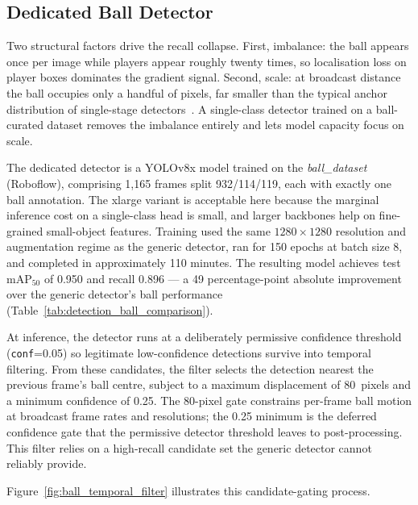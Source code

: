 \subsection{Dedicated Ball Detector}
\label{subsec:methodology_ball_detector}

Two structural factors drive the recall collapse. First, imbalance: the ball
appears once per image while players appear roughly twenty times, so
localisation loss on player boxes dominates the gradient signal. Second,
scale: at broadcast distance the ball occupies only a handful of pixels, far
smaller than the typical anchor distribution of single-stage
detectors~\cite{Redmon2016, redmon2018yolov3}. A single-class detector
trained on a ball-curated dataset removes the imbalance entirely and lets
model capacity focus on scale.

The dedicated detector is a YOLOv8x model trained on the
\textit{ball\_dataset} (Roboflow), comprising 1{,}165 frames split 932/114/119,
each with exactly one ball annotation. The xlarge variant is acceptable
here because the marginal inference cost on a single-class head is small, and larger
backbones help on fine-grained small-object features. Training used the same
$1280 \times 1280$ resolution and augmentation regime as the generic
detector, ran for 150 epochs at batch size 8, and completed in approximately
110 minutes. The resulting model achieves test $\mathrm{mAP}_{50}$ of 0.950 and recall
0.896 --- a 49 percentage-point absolute improvement over the generic
detector's ball performance (Table~\ref{tab:detection_ball_comparison}).

At inference, the detector runs at a deliberately permissive confidence
threshold (\texttt{conf}=0.05) so legitimate low-confidence detections
survive into temporal filtering. From these candidates, the filter selects
the detection nearest the previous frame's ball centre, subject to a maximum
displacement of 80~pixels and a minimum confidence of 0.25. The 80-pixel
gate constrains per-frame ball motion at broadcast frame rates and
resolutions; the 0.25 minimum is the deferred confidence gate that the
permissive detector threshold leaves to post-processing. This filter relies
on a high-recall candidate set the generic detector cannot reliably provide.

Figure~\ref{fig:ball_temporal_filter} illustrates this candidate-gating process.

